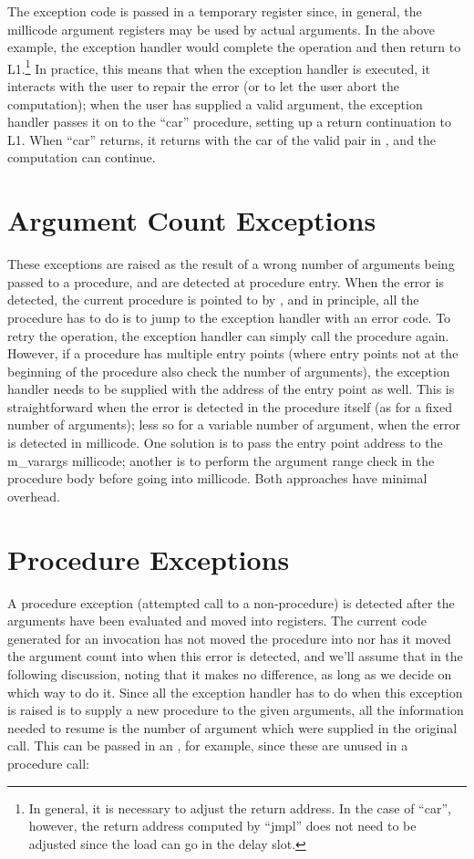 The exception code is passed in a temporary register since, in
general, the millicode argument registers may be used by actual
arguments. In the above example, the exception handler would complete
the operation and then return to L1.\footnote{In general, it is
necessary to adjust the return address. In the case of ``car'',
however, the return address computed by ``jmpl'' does not need to be
adjusted since the load can go in the delay slot.} In practice, this
means that when the exception handler is executed, it interacts with
the user to repair the error (or to let the user abort the
computation); when the user has supplied a valid argument, the
exception handler passes it on to the ``car'' procedure, setting up a
return continuation to L1. When ``car'' returns, it returns with the car
of the valid pair in , and the computation can continue.

\section{Argument Count Exceptions}

These exceptions are raised as the result of a wrong number of
arguments being passed to a procedure, and are detected at procedure
entry.  When the error is detected, the current procedure is pointed
to by , and in principle, all the procedure has to do is to
jump to the exception handler with an error code. To retry the
operation, the exception handler can simply call the procedure again.
However, if a procedure has multiple entry points (where entry points
not at the beginning of the procedure also check the number of
arguments), the exception handler needs to be supplied with the
address of the entry point as well. This is straightforward when the
error is detected in the procedure itself (as for a fixed number of
arguments); less so for a variable number of argument, when the error
is detected in millicode. One solution is to pass the entry point
address to the {\sc m\_varargs} millicode; another is to perform the
argument range check in the procedure body before going into
millicode. Both approaches have minimal overhead.

\section{Procedure Exceptions}

A procedure exception (attempted call to a non-procedure) is detected
after the arguments have been evaluated and moved into registers. The
current code generated for an invocation has not moved the procedure
into  nor has it moved the argument count into 
when this error is detected, and we'll assume that in the following
discussion, noting that it makes no difference, as long as we decide
on which way to do it. Since all the exception handler has to do when
this exception is raised is to supply a new procedure to the given
arguments, all the information needed to resume is the number of
argument which were supplied in the original call. This can be passed
in an , for example, since these are unused in a procedure call:

